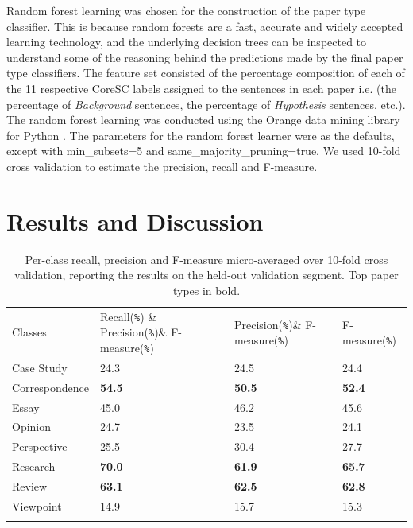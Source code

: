 \documentclass{svmult}
\begin{document}

Random forest learning \cite{Breiman2001} was chosen for the construction of the
paper type classifier. This is because random forests are a fast, accurate and
widely accepted learning technology, and the underlying decision trees can be
inspected to understand some of the reasoning behind the predictions made by
the final paper type classifiers. The feature set consisted of the percentage
composition of each of the 11 respective CoreSC labels assigned to the
sentences in each paper i.e. (the percentage of {\em Background} sentences, the
percentage of {\em Hypothesis} sentences, etc.). The random forest learning was
conducted using the Orange data mining library for Python \cite{Curk2005}.  The
parameters for the random forest learner were as the defaults, except with
min\_subsets=5 and same\_majority\_pruning=true.  We used 10-fold cross
validation to estimate the precision, recall and F-measure.


\section{Results and Discussion}
\label{sec:3}


\begin{table}

\caption{Per-class recall, precision and F-measure micro-averaged over 10-fold cross validation, reporting the results on the held-out validation segment. Top paper types in bold.}

\begin{tabular}{p{2.4cm}p{2.0cm}p{2.0cm}p{2.5cm}}
\hline\noalign{\smallskip}
Classes & Recall(\verb|%|) & Precision(\verb|%|)& F-measure(\verb|%|) \\
\noalign{\smallskip}\svhline\noalign{\smallskip}
Case Study      &   24.3    &    24.5     &   24.4 \\
Correspondence  &   {\bf  54.5}    &    {\bf 50.5}    &    {\bf 52.4} \\ 
Essay           &   45.0     &   46.2    &    45.6 \\
Opinion         &   24.7    &    23.5  &      24.1 \\   
Perspective     &   25.5  &      30.4  &       27.7 \\
Research        &   {\bf 70.0}    &    {\bf 61.9}    &    {\bf 65.7} \\
Review          &  {\bf 63.1}     &   {\bf 62.5}     &   {\bf 62.8} \\
Viewpoint       &     14.9     &   15.7  &      15.3 \\
\noalign{\smallskip}\hline\noalign{\smallskip}
\end{tabular}


\label{tab:recallPrecision}       %
\end{table}
\end{document}
